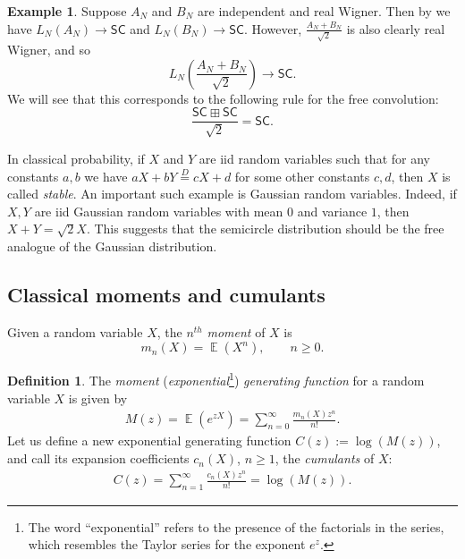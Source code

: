 \documentclass[letterpaper,11pt,oneside,reqno]{amsart}
\numberwithin{equation}{section}
\newcommand{\SC}{\mathsf{SC}}
\DeclareMathOperator{\EE}{\mathbb{E}}
\theoremstyle{definition}
\newtheorem{definition}[proposition]{Definition}
\newtheorem{example}[proposition]{Example}
\begin{document}
\begin{example}
	Suppose $A_N$ and $B_N$ are independent and real Wigner. 
	Then by  we have
	$L_N(A_N)\to \SC$ and $L_N(B_N)\to \SC$. However, 
	$\displaystyle\frac{A_N+B_N}{\sqrt{2}}$ is also clearly real Wigner, and so
	\begin{equation*}
		L_N\left(\frac{A_N+B_N}{\sqrt{2}}\right) \to \SC.
	\end{equation*}
	We will see that this corresponds to the following
	rule for the free convolution:
	\begin{equation}\label{free_conv_SC}
		\frac{\SC\boxplus\SC}{\sqrt{2}}=\SC.
	\end{equation}

	In classical probability, if $X$ and $Y$ are iid random variables 
	such that for any constants $a,b$ we have 
	$aX+bY\stackrel{D}{=} cX+d$ for some other constants $c,d$, then $X$ is called
	\emph{stable}. An important such example is Gaussian random variables.
	Indeed, if  $X,Y$ are iid Gaussian random variables with mean $0$
	and variance $1$, then
	$X+Y=\sqrt{2}X$.  
	This suggests that the semicircle distribution should
	be the free analogue of the Gaussian distribution.
\end{example}


\subsection{Classical moments and cumulants} %
\label{sub:classical_moments_and_cumulants}

Given a random variable $X$, the $n^{th}$ \emph{moment} of $X$ is
\begin{equation*}
	m_n(X)=\EE(X^n),\qquad n\geq 0.
\end{equation*}

\begin{definition}
The \emph{moment} (\emph{exponential}\footnote{The word
``exponential'' refers to the presence of the factorials in the series, which
resembles the Taylor series for the exponent $e^{z}$.}) \emph{generating function} for a random variable $X$ is given by 
\begin{align}\label{Moment_Gen}
\displaystyle M(z)=\EE (e^{z X})=\sum_{n=0}^\infty \frac{m_n(X)z^n}{n!}.
\end{align}
Let us define a new exponential generating function $C(z):=\log(M(z))$, and call its expansion coefficients $c_n(X)$, $n\ge1$,
the \emph{cumulants} of $X$:
\begin{align}\label{Cumulant_Gen}
\displaystyle C(z)=\sum_{n=1}^\infty \frac{c_n(X)z^n}{n!}=\log(M(z)).
\end{align}
\end{definition}
\end{document}
